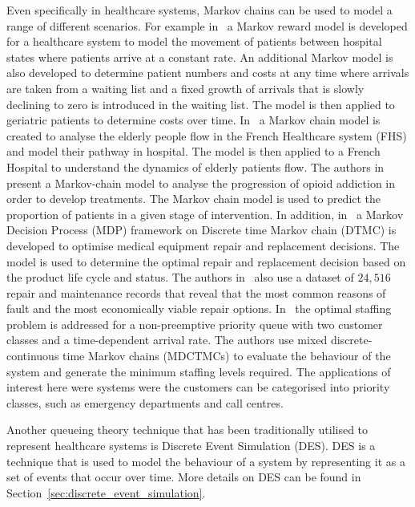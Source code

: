 Even specifically in healthcare systems, Markov chains can be used to model a
range of different scenarios.
For example in~\cite{McClean2006256} a Markov reward model is developed for a
healthcare system to model the movement of patients between hospital states
where patients arrive at a constant rate.
An additional Markov model is also developed to determine patient numbers and
costs at any time where arrivals are taken from a waiting list and a fixed
growth of arrivals that is slowly declining to zero is introduced in the
waiting list.
The model is then applied to geriatric patients to determine costs over time.
In~\cite{Hamdani2015} a Markov chain model is created to analyse the elderly
people flow in the French Healthcare system (FHS) and model their pathway in
hospital.
The model is then applied to a French Hospital to understand the dynamics of
elderly patients flow.
The authors in~\cite{Gosavi2020399} present a Markov-chain model to analyse
the progression of opioid addiction in order to develop treatments.
The Markov chain model is used to predict the proportion of patients in a
given stage of intervention.
In addition, in~\cite{Liao2021} a Markov Decision Process (MDP) framework on
Discrete time Markov chain (DTMC) is developed to optimise medical equipment
repair and replacement decisions.
The model is used to determine the optimal repair and replacement decision
based on the product life cycle and status.
The authors in~\cite{Liao2021} also use a dataset of \(24,516\) repair and
maintenance records that reveal that the most common reasons of fault and the
most economically viable repair options.
In~\cite{vile2017queueing} the optimal staffing problem is addressed for a
non-preemptive priority queue with two customer classes and a time-dependent
arrival rate.
The authors use mixed discrete-continuous time Markov chains (MDCTMCs) to
evaluate the behaviour of the system and generate the minimum staffing levels
required.
The applications of interest here were systems were the customers can be
categorised into priority classes, such as emergency departments and call
centres.


Another queueing theory technique that has been traditionally utilised to
represent healthcare systems is Discrete Event Simulation (DES).
DES is a technique that is used to model the behaviour of a system by
representing it as a set of events that occur over time.
More details on DES can be found in Section~\ref{sec:discrete_event_simulation}.

